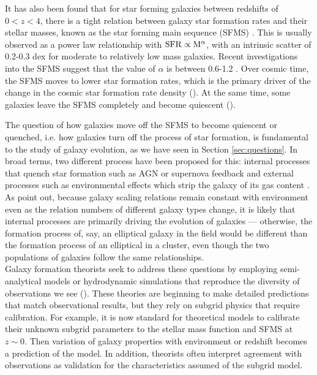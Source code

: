 It has also been found that for star forming galaxies between
redshifts of $0 < z < 4$, there is a tight relation between galaxy
star formation rates and their stellar masses, known as the star
forming main sequence (SFMS) \citep{brinchmann_physical_2004,
  2007ApJ...660L..43N, 2015A&A...575A..74S}. This is usually observed
as a power law relationship with ${\rm SFR} \propto {\rm M}^{\alpha}$,
with an intrinsic scatter of 0.2-0.3 dex for moderate to relatively
low mass galaxies. Recent investigations into the SFMS suggest that
the value of $\alpha$ is between 0.6-1.2
\citep{2014ApJS..214...15S}. Over cosmic time, the SFMS moves to lower
star formation rates, which is the primary driver of the change in the
cosmic star formation rate density (\citealt{madau_cosmic_2014}). At
the same time, some galaxies leave the SFMS completely and become
quiescent (\citealt{moustakas_primus:_2013, hahn_primus_2015}).


The question of how galaxies move off the SFMS to become quiescent or
quenched, i.e. how galaxies turn off the process of star formation, is
fundamental to the study of galaxy evolution, as we have seen in
Section \ref{sec:questions}. In broad terms, two different process
have been proposed for this: internal processes that quench star
formation such as AGN or supernova feedback \citep{peng_mass_2010} and
external processes such as environmental effects which strip the
galaxy of its gas content \citep{peng_mass_2012,
  2012ApJ...757...85G}. As \citet{blanton_physical_2019-1} point out,
because galaxy scaling relations remain constant with environment even
as the relation numbers of different galaxy types change, it is likely
that internal processes are primarily driving the evolution of
galaxies --- otherwise, the formation process of, say, an elliptical
galaxy in the field would be different than the formation process of
an elliptical in a cluster, even though the two populations of
galaxies follow the same relationships. \\

Galaxy formation theorists seek to address these questions by
employing semi-analytical models or hydrodynamic simulations that
reproduce the diversity of observations we see
(\citealt{somerville15a}). These theories are beginning to make
detailed predictions that match observational results, but they rely
on subgrid physics that require calibration. For example, it is now
standard for theoretical models to calibrate their unknown subgrid
parameters to the stellar mass function and SFMS at $z\sim 0$.  Then
variation of galaxy properties with environment or redshift becomes a
prediction of the model. In addition, theorists often interpret
agreement with observations as validation for the characteristics
assumed of the subgrid model.\\


